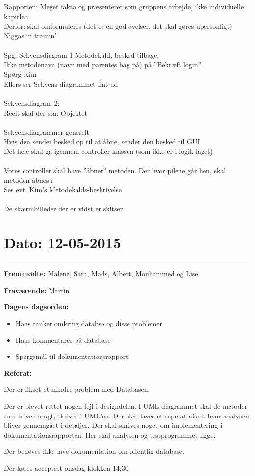 Rapporten: Meget fakta og præsenteret som gruppens arbejde, ikke individuelle kapitler.\\
	Derfor: skal omformuleres (det er en god øvelser, det skal gøres upersonligt)
	Niggas in trainin’
\\
\\
Spg: Sekvensdiagram 1
	Metodekald, besked tilbage.	\\
Ikke metodenavn (navn med parentes bag på) på ”Bekræft login”\\
Spørg Kim\\
Ellers ser Sekvens diagrammet fint ud
\\
\\

Sekvensdiagram 2:\\
	Reelt skal der stå: Objektet
\\
\\
Sekvensdiagrammer generelt\\
	Hvis den sender besked op til at åbne, sender den besked til GUI\\
	Det hele skal gå igennem controller-klassen (som ikke er i logik-laget)
\\
\\

Vores controller skal have ”åbner” metoden.
Der hvor pilene går hen, skal metoden åbnes i\\
Ses evt. Kim’s Metodekalds-beskrivelse
\\
\\

De skærmbilleder der er vidst er skitser.


\section{Dato: 12-05-2015}
\hrule


\textbf{Fremmødte:} Malene, Sara, Mads, Albert, Mouhammed og Lise 

\textbf{Fraværende:} Martin

\textbf{Dagens dagsorden:}
\begin{itemize}
	\item Hans tanker omkring databse og disse problemer
	\item Hans kommentarer på database
	\item Spørgsmål til dokumentationsrapport
\end{itemize}

\textbf{Referat:}

Der er fikset et mindre problem med Databasen. 

Der er blevet rettet nogen fejl i designdelen. I UML-diagrammet skal de metoder som bliver brugt, skrives i UML'en. Der skal laves et seperat afsnit hvor analysen bliver gennemgået i detaljer. Der skal skrives noget om implementering i dokumentationsrapporten. Her skal analysen og testprogrammet ligge. 

Der behøves ikke lave dokumentation om offentlig database. 

Der køres acceptest onsdag klokken 14:30. 

 



